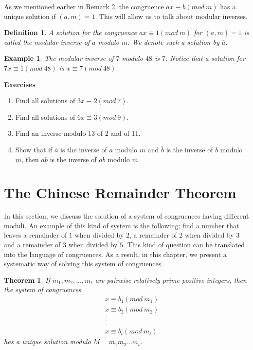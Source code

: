 \documentclass[12pt,letterpaper]{book}
\newtheorem{definition}{Definition}
\newtheorem{theorem}{Theorem}
\newtheorem{example}{Example}
\begin{document}
As we mentioned earlier in Remark 2, the congruence $ax\equiv b(mod
\ m)$ has a unique solution if $(a,m)=1$.  This will allow us to
talk about modular inverses.

\begin{definition}
A solution for the congruence $ax\equiv 1 (mod\ m)$ for $(a,m)=1$ is
called the modular inverse of $a$ modulo $m$. We denote such a solution by $\bar{a}$.
\end{definition}  

\begin{example}
The modular inverse of $7$ modulo $48$ is $7$.  Notice that a solution for
$7x\equiv 1(mod \ 48)$ is $x\equiv 7 (mod \ 48)$.
\end{example}

\textbf{Exercises}
\begin{enumerate}
\item{Find all solutions of $3x\equiv 2(mod \ 7)$.}\item{Find all
solutions of $6x\equiv 3(mod \ 9)$.}\item{Find an inverse modulo 13
of 2 and of 11.}\item{Show that if $\bar{a}$ is the inverse of $a$
modulo $m$ and $\bar{b}$ is the inverse of $b$ modulo $m$, then
$\bar{a}\bar{b}$ is the inverse of $ab$ modulo $m$.}
\end{enumerate}

\newpage

\section{The Chinese Remainder Theorem}
In this section, we discuss the solution of a system of congruences
having different moduli.  An example of this kind of system is the
following; find a number that leaves a remainder of $1$ when divided
by $2$, a remainder of $2$ when divided by $3$ and a remainder of $3$
when divided by $5$.  This kind of question can be translated into the
language of congruences.  As a result, in this chapter, we present a
systematic way of solving this system of congruences. 
\begin{theorem}
If $m_1,m_2,...,m_t$
are pairwise relatively prime positive integers, then the system of congruences
\begin{eqnarray*}
&& x\equiv b_1(mod \ m_1)\\&&x\equiv b_2(mod \
m_2)\\&&.\\&&.\\&&.\\&& x\equiv b_t(mod \ m_t)
\end{eqnarray*}
has a unique solution modulo $M=m_1m_2...m_t$.
\end{theorem}
\end{document}
